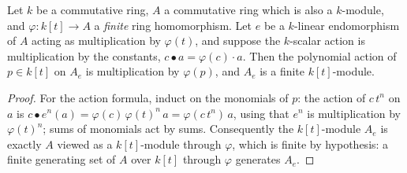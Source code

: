 \begin{lemma}
  \label{pa-lem:moduleFinite_aeval_ringHom}
  \leanok

  Let \(k\) be a commutative ring, \(A\) a commutative ring which is also a
  \(k\)-module, and \(\varphi : k[t] \to A\) a \emph{finite} ring homomorphism. Let
  \(e\) be a \(k\)-linear endomorphism of \(A\) acting as multiplication by
  \(\varphi(t)\), and suppose the \(k\)-scalar action is multiplication by the constants,
  \(c \bullet a = \varphi(c) \cdot a\). Then the polynomial action of \(p \in k[t]\) on
  \(A_e\) is multiplication by \(\varphi(p)\), and \(A_e\) is a finite \(k[t]\)-module.
\end{lemma}
\begin{proof}
  \leanok
  For the action formula, induct on the monomials of \(p\): the action of \(c\,t^n\) on
  \(a\) is \(c \bullet e^n(a) = \varphi(c)\,\varphi(t)^n\, a = \varphi(c\,t^n)\, a\),
  using that \(e^n\) is multiplication by \(\varphi(t)^n\); sums of monomials act by
  sums. Consequently the \(k[t]\)-module \(A_e\) is exactly \(A\) viewed as a
  \(k[t]\)-module through \(\varphi\), which is finite by hypothesis: a finite
  generating set of \(A\) over \(k[t]\) through \(\varphi\) generates \(A_e\).
\end{proof}

